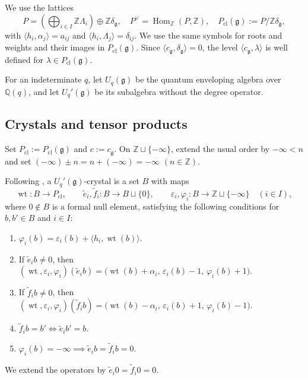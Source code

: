 \documentclass[11pt,reqno]{amsart}
\newcommand{\wt}{\operatorname{wt}}
\numberwithin{table}{section}
\numberwithin{equation}{section}
\theoremstyle{plain}
\theoremstyle{definition}
\begin{document}
We use the lattices
\[
	P=
	\left(\bigoplus_{i\in I}\mathbb Z\Lambda_i\right)
	\oplus\mathbb Z\delta_{\mathfrak g},
	\quad
	P^\vee=\operatorname{Hom}_{\mathbb Z}(P,\mathbb Z),
	\quad
	P_{\mathrm{cl}}(\mathfrak g)
	:=
	P/\mathbb Z\delta_{\mathfrak g},
\]
with
\(\langle h_i,\alpha_j\rangle=a_{ij}\) and
\(\langle h_i,\Lambda_j\rangle=\delta_{ij}\).
We use the same symbols for roots and weights and their images in
\(P_{\mathrm{cl}}(\mathfrak g)\).
Since \(\langle c_{\mathfrak g},\delta_{\mathfrak g}\rangle=0\),
the level \(\langle c_{\mathfrak g},\lambda\rangle\) is well defined
for \(\lambda\in P_{\mathrm{cl}}(\mathfrak g)\).

For an indeterminate \(q\), let \(U_q(\mathfrak g)\) be the quantum
enveloping algebra over \(\mathbb Q(q)\), and let
\(U_q'(\mathfrak g)\) be its subalgebra without the degree operator.


\subsection{Crystals and tensor products}

Set \(P_{\mathrm{cl}}:=P_{\mathrm{cl}}(\mathfrak g)\) and
\(c:=c_{\mathfrak g}\).
On \(\mathbb Z\sqcup\{-\infty\}\), extend the usual order by
\(-\infty<n\) and set $(-\infty)\pm n=n+(-\infty)=-\infty$ $(n\in\mathbb Z)$.

Following \cite[Definition~2.1]{JayneMisra}, a
\(U_q'(\mathfrak g)\)-crystal is a set \(B\) with maps
\[
\wt:B\longrightarrow P_{\mathrm{cl}},
\qquad
\widetilde e_i,\widetilde f_i:
B\longrightarrow B\sqcup\{0\},
\qquad
\varepsilon_i,\varphi_i:
B\longrightarrow\mathbb Z\sqcup\{-\infty\}
\quad(i\in I),
\]
where \(0\notin B\) is a formal null element, satisfying the
following conditions for \(b,b'\in B\) and \(i\in I\):
\begin{enumerate}
	\item[\textup{(C1)}] $	\varphi_i(b)
	=
	\varepsilon_i(b)+\langle h_i,\wt(b)\rangle$.

	\item[\textup{(C2)}]
	If \(\widetilde e_i b\ne0\), then $(\wt,\varepsilon_i,\varphi_i)(\widetilde e_i b)
	=
	\bigl(
	\wt(b)+\alpha_i,\,
	\varepsilon_i(b)-1,\,
	\varphi_i(b)+1
	\bigr)$.

	\item[\textup{(C3)}]
	If \(\widetilde f_i b\ne0\), then $(\wt,\varepsilon_i,\varphi_i)(\widetilde f_i b)
	=
	\bigl(
	\wt(b)-\alpha_i,\,
	\varepsilon_i(b)+1,\,
	\varphi_i(b)-1
	\bigr)$.

	\item[\textup{(C4)}]
	$\widetilde f_i b=b'
	\iff
	\widetilde e_i b'=b$.

	
	\item[\textup{(C5)}]
	$\varphi_i(b)=-\infty
	\implies
	\widetilde e_i b=\widetilde f_i b=0$.
\end{enumerate}
We extend the operators by
\(\widetilde e_i0=\widetilde f_i0=0\).
\end{document}
